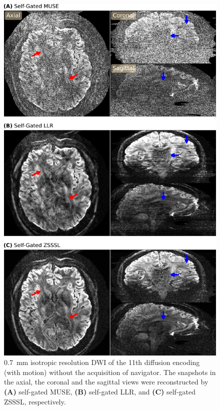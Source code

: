 \documentclass[journal,twoside,web]{ieeecolor}
\begin{document}
	\begin{figure}
		\centering
		\includegraphics[width=\columnwidth]{../figures/fig7.png}
		\caption{\SI{0.7}{\milli\meter} isotropic resolution DWI
			of the 11th diffusion encoding (with motion)
			without the acquisition of navigator.
			The snapshots in the axial, the coronal and the sagittal views
			were reconstructed by \textbf{(A)} self-gated MUSE,
			\textbf{(B)} self-gated LLR, and
			\textbf{(C)} self-gated ZSSSL, respectively.}
		\label{FIG:MOTION_PROS}
	\end{figure}
\end{document}
